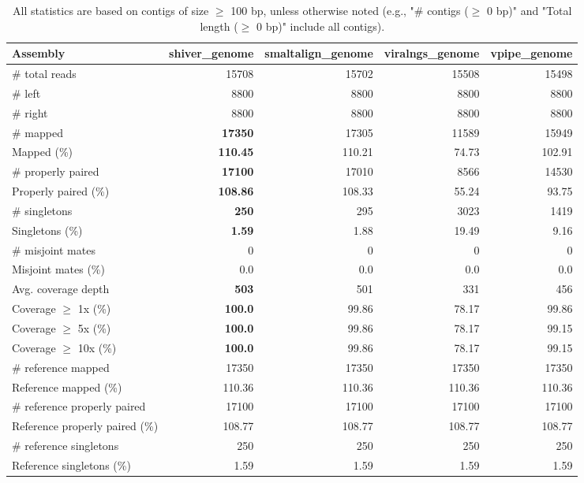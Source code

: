 \documentclass[12pt,a4paper]{article}
\begin{document}
\begin{table}[ht]
\begin{center}
\caption{All statistics are based on contigs of size $\geq$ 100 bp, unless otherwise noted (e.g., "\# contigs ($\geq$ 0 bp)" and "Total length ($\geq$ 0 bp)" include all contigs).}
\begin{tabular}{|l*{4}{|r}|}
\hline
Assembly & shiver\_genome & smaltalign\_genome & viralngs\_genome & vpipe\_genome \\ \hline
\# total reads & 15708 & 15702 & 15508 & 15498 \\ \hline
\# left & 8800 & 8800 & 8800 & 8800 \\ \hline
\# right & 8800 & 8800 & 8800 & 8800 \\ \hline
\# mapped & {\bf 17350} & 17305 & 11589 & 15949 \\ \hline
Mapped (\%) & {\bf 110.45} & 110.21 & 74.73 & 102.91 \\ \hline
\# properly paired & {\bf 17100} & 17010 & 8566 & 14530 \\ \hline
Properly paired (\%) & {\bf 108.86} & 108.33 & 55.24 & 93.75 \\ \hline
\# singletons & {\bf 250} & 295 & 3023 & 1419 \\ \hline
Singletons (\%) & {\bf 1.59} & 1.88 & 19.49 & 9.16 \\ \hline
\# misjoint mates & 0 & 0 & 0 & 0 \\ \hline
Misjoint mates (\%) & 0.0 & 0.0 & 0.0 & 0.0 \\ \hline
Avg. coverage depth & {\bf 503} & 501 & 331 & 456 \\ \hline
Coverage $\geq$ 1x (\%) & {\bf 100.0} & 99.86 & 78.17 & 99.86 \\ \hline
Coverage $\geq$ 5x (\%) & {\bf 100.0} & 99.86 & 78.17 & 99.15 \\ \hline
Coverage $\geq$ 10x (\%) & {\bf 100.0} & 99.86 & 78.17 & 99.15 \\ \hline
\# reference mapped & 17350 & 17350 & 17350 & 17350 \\ \hline
Reference mapped (\%) & 110.36 & 110.36 & 110.36 & 110.36 \\ \hline
\# reference properly paired & 17100 & 17100 & 17100 & 17100 \\ \hline
Reference properly paired (\%) & 108.77 & 108.77 & 108.77 & 108.77 \\ \hline
\# reference singletons & 250 & 250 & 250 & 250 \\ \hline
Reference singletons (\%) & 1.59 & 1.59 & 1.59 & 1.59 \\ \hline

\end{tabular}
\end{center}
\end{table}
\end{document}
